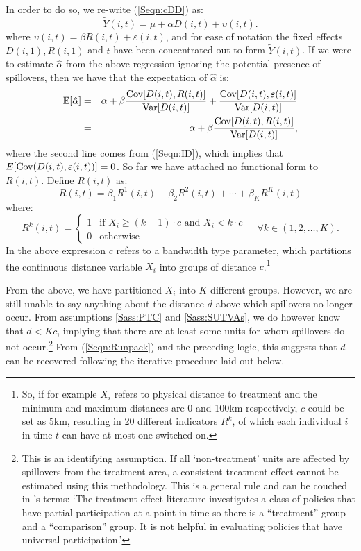 In order to do so, we re-write (\ref{Seqn:cDD}) as:
\begin{equation}
\label{Seqn:cDDconc}
\tilde{Y}(i,t)=\mu + \alpha D(i,t) + \upsilon(i,t).
\end{equation}
where $\upsilon(i,t)=\beta R(i,t)+\varepsilon(i,t)$, and for ease of notation
the fixed effects $D(i,1), R(i,1)$ and $t$ have been concentrated out to form
$\tilde{Y}(i,t)$.  If we were to estimate $\hat\alpha$ from the above regression
ignoring the potential presence of spillovers, then we have that the 
expectation of $\hat\alpha$ is:
\begin{eqnarray}
\label{Seqn:alphaExp}
\mathbb{E}[\hat\alpha] &=& \alpha + \beta\frac{\mathrm{Cov}[D(i,t),R(i,t)]}{\mathrm{Var}[D(i,t)]}+\frac{\mathrm{Cov}[D(i,t),\varepsilon(i,t)]}{\mathrm{Var}[D(i,t)]} \nonumber \\ 
              &=& \alpha + \beta\frac{\mathrm{Cov}[D(i,t),R(i,t)]}{\mathrm{Var}[D(i,t)]},
\end{eqnarray}
where the second line comes from (\ref{Seqn:ID}), which implies that
$E[\mathrm{Cov}(D(i,t),\varepsilon(i,t))]=0$.  So far we have attached no functional 
form to $R(i,t)$.  Define $R(i,t)$ as:
\begin{equation}
\label{Seqn:Runpack}
R(i,t) = \beta_1R^1(i,t)+\beta_2R^2(i,t)+ \cdots + \beta_KR^K(i,t)
\end{equation}  
where:
\begin{equation}
\label{Seqn:Rpar}
 R^k(i,t) =
  \begin{cases}
   1   & \text{if\ \ } X_i\geq(k-1)\cdot c \text{\ \ and \ } X_i<k\cdot c \\
   0   & \text{otherwise} 
  \end{cases}\ \ \ \ \ \forall k \in (1,2,\ldots,K).
\end{equation}
In the above expression $c$ refers to a bandwidth type parameter, which partitions
the continuous distance variable $X_i$ into groups of distance $c$.\footnote{So, if
for example $X_i$ refers to physical distance to treatment and the minimum and 
maximum distances are 0 and 100km respectively, $c$ could be set as 5km, resulting
in 20 different indicators $R^k$, of which each individual $i$ in time $t$ can
have at most one switched on.}

From the above, we have partitioned $X_i$ into $K$ different groups.  However, we
are still unable to say anything about the distance $d$ above which spillovers no 
longer occur.  From assumptions \ref{Sass:PTC} and \ref{Sass:SUTVAs}, we do however
know that $d<Kc$, implying that there are at least some units for whom spillovers
do not occur.\footnote{This is an identifying assumption.  If all `non-treatment'
units are affected by spillovers from the treatment area, a consistent treatment
effect cannot be estimated using this methodology.  This is a general rule and can 
be couched in \citet{HeckmanVytlacil2005}'s terms: `The treatment effect literature 
investigates a class of policies that have partial participation at a point in time 
so there is a ``treatment'' group and a ``comparison'' group. It is not helpful in 
evaluating policies that have universal participation.'}  From (\ref{Seqn:Runpack}) 
and the preceding logic, this suggests that $d$ can be recovered following the 
iterative procedure laid out below.

